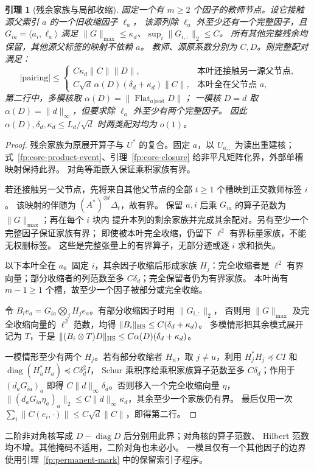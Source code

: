 \documentclass[a4paper]{tufte-handout}
\newtheorem{lemma}{引理}
\begin{document}
\begin{fullwidth}
\begin{lemma}[残余家族与局部收缩]
固定一个有 $m\ge2$ 个因子的教师节点。设它接触源父索引 $a$ 的一个旧收缩因子 $\ell_a$，
该源列除 $\ell_a$ 外至少还有一个完整因子，且 $G_{ia}=\langle a_i,\ell_a\rangle$ 满足
$\|G\|_{\max}\le\kappa_d$、$\sup_i\|G_{i,:}\|_2\le C$。
所有其他完整残余均保留，其他源父标签的映射不依赖 $a$。
教师、源原系数分别为 $C,D$。则完整配对满足：
\begin{equation}\label{fp:local-unified}
 |\mathrm{pairing}|\le
 \begin{cases}
 C\kappa_d\|C\|\|D\|,&\text{本叶还接触另一源父节点},\\
 C\sqrt d\,\alpha(D)(\delta_d+\kappa_d)\|C\|,&\text{本叶全在父节点 }a,
 \end{cases}
\end{equation}
第二行中，多模核取 $\alpha(D)=\|\operatorname{Flat}_{a|\mathrm{rest}}D\|$；
一模核 $D=d$ 取 $\alpha(D)=\|d\|_\infty$，但要求除 $\ell_a$ 外至少有两个完整因子。
因此 $\alpha(D),\delta_d,\kappa_d\le L_d/\sqrt d$ 时两类配对均为 $o(1)$。
\end{lemma}
\begin{proof}
残余家族为原展开算子与 $U^*$ 的复合。固定 $a$，以 $U_{a,:}$ 为读出重建核；
式~\eqref{fp:core-product-event}、引理~\ref{fp:core-closure} 给非平凡矩阵化界，外部单槽映射保持此界。
对角等距嵌入保证乘积家族有界。

若还接触另一父节点，先将来自其他父节点的全部 $t\ge1$ 个槽映到正交教师标签 $i$。
该映射的伴随为 $(A^*)^{\otimes t}\Delta_t$，故有界。
保留 $a,i$ 后乘 $G_{ia}$ 的算子范数为 $\|G\|_{\max}$；再在每个 $i$ 块内
提升本列的剩余家族并完成其余配对。另有至少一个完整因子保证家族有界；
即使被本叶完全收缩，仍留下 $\ell^2$ 有界标量家族，不能无权删标签。
这些是完整张量上的有界算子，无部分迹或逐 $i$ 求和损失。

以下本叶全在 $a$。固定 $i$，其余因子收缩后形成家族 $H_j$：完全收缩者是
$\ell^2$ 有界向量；部分收缩者的列范数至多 $C\delta_d$；完全保留者仍为有界家族。
本叶尚有 $m-1\ge1$ 个槽，故至少一个因子被部分或完全收缩。

令 $B_ie_a=G_{ia}\bigotimes_jH_j e_a$。有部分收缩因子时用 $\|G_{i,:}\|_2$，
否则用 $\|G\|_{\max}$ 及完全收缩向量的 $\ell^2$ 范数，均得
$\|B_i\|_{\rm HS}\le C(\delta_d+\kappa_d)$。
多模情形把其余模式展开记为 $T$，于是
$\|(B_i\otimes T)D\|_{\rm HS}\le C\alpha(D)(\delta_d+\kappa_d)$。

一模情形至少有两个 $H_j$。若有部分收缩者 $H_u$，取 $j\ne u$，利用
$H_j^*H_j\preceq CI$ 和 $\operatorname{diag}(H_u^*H_u)\preceq C\delta_d^2I$，
Schur 乘积序给乘积家族算子范数至多 $C\delta_d$；作用于 $(d_aG_{ia})_a$ 即得
$C\|d\|_\infty\delta_d$。否则移入一个完全收缩向量 $\eta$，
$\|(d_aG_{ia}\eta_a)_a\|_2\le C\|d\|_\infty\kappa_d$，其余至少一个家族仍有界。
最后仅用一次 $\sum_i\|C(e_i,\cdot)\|\le C\sqrt d\|C\|$，即得第二行。
\end{proof}
二阶非对角核写成 $D-\operatorname{diag}D$ 后分别用此界；对角核的算子范数、
Hilbert 范数均不增。其他掩码不适用，二阶对角也未必小。
一模且仅有一个其他因子的边界使用引理~\ref{fp:permanent-mark} 中的保留索引子程序。


\end{fullwidth}
\end{document}
